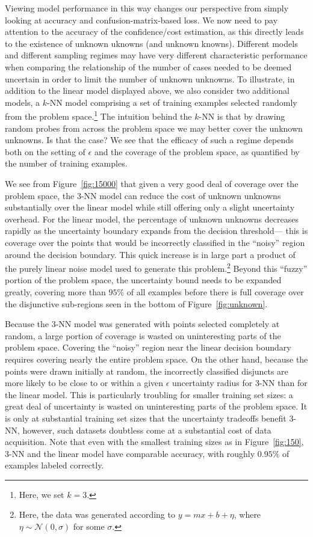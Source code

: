 Viewing model performance in this way changes our perspective from
simply looking at accuracy and confusion-matrix-based loss. We now need to pay attention
to the accuracy of the confidence/cost estimation, as this directly leads to the existence
of unknown uknowns (and unknown knowns). 
Different
models and different sampling regimes may have very different
characteristic performance when comparing the relationship of the
number of cases needed to be deemed uncertain in order to limit the
number of unknown unknowns.
To illustrate, in addition to
the linear model displayed above, we also consider two additional
models, a $k$-NN model comprising a set of training examples selected randomly
from the problem space.\footnote{Here, we set $k=3$.} The intuition behind the $k$-NN is that by drawing
random probes from across the problem space we may better cover the unknown unknowns.  Is that the case?  We see that the efficacy of such a regime depends both on the setting of $\epsilon$ and the  coverage of the problem space, as quantified by the number of training examples. 

We see from Figure~\ref{fig:15000} that given a very good deal of coverage over the problem space, the $3$-NN model can reduce the cost of unknown unknowns substantially over the linear model while still offering only a slight uncertainty overhead. For the linear model, the percentage of unknown unknowns decreases rapidly as the uncertainty boundary expands from the decision threshold--- this is coverage over the points that would be incorrectly classified in the ``noisy'' region around the decision boundary. This quick increase is in large part a product of the purely linear noise model used to generate this problem.\footnote{Here, the data was generated according to $y = mx + b + \eta$, where $\eta \sim \mathcal{N}(0, \sigma)$ for some $\sigma$.} Beyond this ``fuzzy'' portion of the problem space, the uncertainty bound needs to be expanded greatly, covering more than $95\%$ of all examples before there is full coverage over the disjunctive sub-regions seen in the bottom of Figure~\ref{fig:unknown}.  

Because the $3$-NN model was generated with points selected completely at random, a large portion of coverage is wasted on uninteresting parts of the problem space. Covering the ``noisy'' region near the linear decision boundary requires covering nearly the entire problem space. On the other hand, because the points were drawn initially at random, the incorrectly classified disjuncts are more likely to be close to or within a given $\epsilon$ uncertainty radius for $3$-NN than for the linear model. This is particularly troubling for smaller training set sizes: a great deal of uncertainty is wasted on uninteresting parts of the problem space. It is only at substantial training set sizes that the uncertainty tradeoffs benefit $3$-NN, however, such datasets doubtless come at a substantial cost of data acquisition. Note that even with the smallest training sizes as in Figure~\ref{fig:150}, $3$-NN and the linear model have comparable accuracy, with roughly $0.95\%$ of examples labeled correctly.

